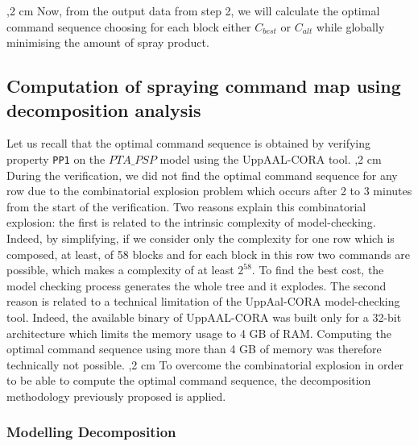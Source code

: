 \documentclass[preprint,3p,times,twocolumn]{elsarticle}
\begin{document}
,2 cm
Now, from the output data from step 2, we will calculate the optimal command sequence choosing for each block either $C_{best}$ or $C_{alt}$ while globally minimising the amount of spray product.

\subsection{Computation of spraying command map  using decomposition analysis}
Let us recall that the optimal command sequence is obtained by verifying property \texttt{PP1} on the $PTA\_PSP$ model using the UppAAL-CORA tool.
,2 cm
During the verification, we did not find the optimal command sequence for any row due to the combinatorial explosion problem which occurs after 2 to 3 minutes from the start of the verification. Two reasons explain this combinatorial explosion: the first is related to the intrinsic complexity of model-checking. Indeed, by simplifying, if we consider only the complexity for one row which is composed, at least, of 58 blocks and for each block in this row two commands are possible, which makes a complexity of at least $2^{58}$. To find the best cost, the model checking process generates the whole tree and it explodes. The second reason is related to a technical limitation of the UppAal-CORA model-checking tool. Indeed, the available binary of UppAAL-CORA was built only for a 32-bit architecture which limits the memory usage to 4 GB of RAM. Computing the optimal command sequence using more than 4 GB of memory was therefore technically not possible.
,2 cm
To overcome the combinatorial explosion in order to be able to compute the optimal command sequence, the decomposition methodology previously proposed is applied. 
\subsubsection{Modelling Decomposition}
\end{document}
